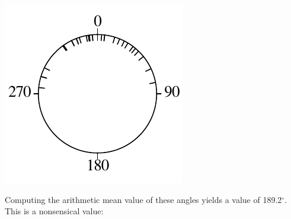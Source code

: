 \noindent\begin{minipage}[t][][b]{.2\textwidth}
\includegraphics[width=\textwidth]{../figures/circle1.pdf}\\
\end{minipage}
\begin{minipage}[t][][t]{.8\textwidth}
  \label{fig:circle1}
\end{minipage}

Computing the arithmetic mean value of these angles yields a value of
189.2$^{\circ}$. This is a nonsensical value:

